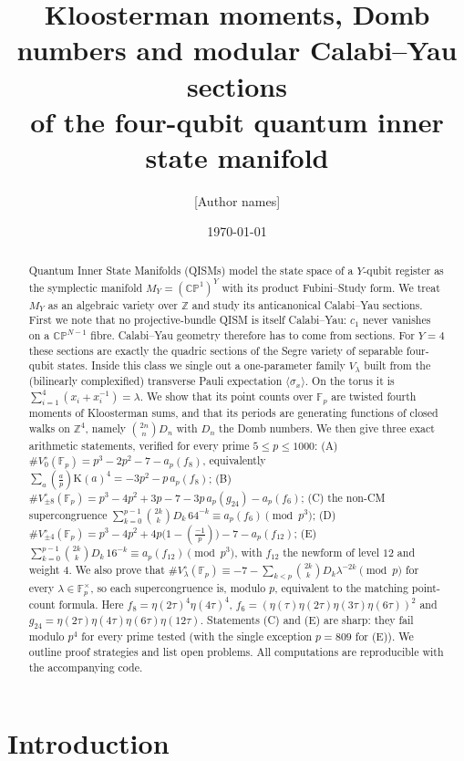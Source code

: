\documentclass[11pt]{amsart}
\title[Arithmetic of Calabi--Yau sections of the four-qubit QISM]{Kloosterman moments, Domb numbers and modular Calabi--Yau sections\\ of the four-qubit quantum inner state manifold}
\author{[Author names]}
\date{\today}
\theoremstyle{definition}
\newcommand{\F}{\mathbb{F}}
\newcommand{\Z}{\mathbb{Z}}
\newcommand{\Kl}{\mathrm{K}}
\newcommand{\leg}[2]{\left(\frac{#1}{#2}\right)}
\begin{document}
\begin{abstract}
Quantum Inner State Manifolds (QISMs) model the state space of a $Y$-qubit register as the symplectic manifold $M_Y=(\mathbb{CP}^1)^Y$ with its product Fubini--Study form. We treat $M_Y$ as an algebraic variety over $\Z$ and study its anticanonical Calabi--Yau sections. First we note that no projective-bundle QISM is itself Calabi--Yau: $c_1$ never vanishes on a $\mathbb{CP}^{N-1}$ fibre. Calabi--Yau geometry therefore has to come from sections. For $Y=4$ these sections are exactly the quadric sections of the Segre variety of separable four-qubit states. Inside this class we single out a one-parameter family $V_\lambda$ built from the (bilinearly complexified) transverse Pauli expectation $\langle\sigma_x\rangle$. On the torus it is $\sum_{i=1}^4(x_i+x_i^{-1})=\lambda$. We show that its point counts over $\F_p$ are twisted fourth moments of Kloosterman sums, and that its periods are generating functions of closed walks on $\Z^4$, namely $\binom{2n}{n}D_n$ with $D_n$ the Domb numbers. We then give three exact arithmetic statements, verified for every prime $5\le p\le 1000$:
(A) $\#V_0^{\circ}(\F_p)=p^3-2p^2-7-a_p(f_8)$, equivalently $\sum_{a}\leg{a}{p}\Kl(a)^4=-3p^2-p\,a_p(f_8)$;
(B) $\#V_{\pm 8}^{\circ}(\F_p)=p^3-4p^2+3p-7-3p\,a_p(g_{24})-a_p(f_6)$;
(C) the non-CM supercongruence $\sum_{k=0}^{p-1}\binom{2k}{k}D_k\,64^{-k}\equiv a_p(f_6)\pmod{p^3}$;
(D) $\#V_{\pm 4}^{\circ}(\F_p)=p^3-4p^2+4p\big(1-\leg{-1}{p}\big)-7-a_p(f_{12})$;
(E) $\sum_{k=0}^{p-1}\binom{2k}{k}D_k\,16^{-k}\equiv a_p(f_{12})\pmod{p^3}$, with $f_{12}$ the newform of level $12$ and weight $4$.
We also prove that $\#V_\lambda^\circ(\F_p)\equiv-7-\sum_{k<p}\binom{2k}kD_k\lambda^{-2k}\pmod p$ for every $\lambda\in\F_p^\times$, so each supercongruence is, modulo $p$, equivalent to the matching point-count formula.
Here $f_8=\eta(2\tau)^4\eta(4\tau)^4$, $f_6=(\eta(\tau)\eta(2\tau)\eta(3\tau)\eta(6\tau))^2$ and $g_{24}=\eta(2\tau)\eta(4\tau)\eta(6\tau)\eta(12\tau)$. Statements (C) and (E) are sharp: they fail modulo $p^4$ for every prime tested (with the single exception $p=809$ for (E)). We outline proof strategies and list open problems. All computations are reproducible with the accompanying code.
\end{abstract}

\maketitle

\section{Introduction}
\end{document}
